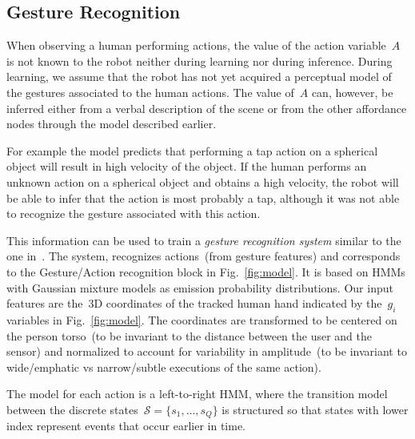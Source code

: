 \subsection{Gesture Recognition}
\label{sec:gesture_recognition}
When observing a human performing actions, the value of the action variable~$A$ is not known to the robot neither during learning nor during inference.
During learning, we assume that the robot has not yet acquired a perceptual model of the gestures associated to the human actions.
The value of~$A$ can, however, be inferred either from a verbal description of the scene or from the other affordance nodes through the \AffWords{} model described earlier.

For example %
the \AffWords{} model predicts that performing a tap action on a spherical object will result in high velocity of the object.
If the human performs an unknown action on a spherical object and obtains a high velocity, the robot will be able to infer that the action is most probably a tap, although it was not able to recognize the gesture associated with this action.

This information can be used to train a \emph{gesture recognition system} similar to the one in~\cite{saponaro:2013:crhri}.
The system, %
recognizes actions~(from gesture features) and corresponds to the Gesture/Action recognition block in Fig.~\ref{fig:model}.
It is based on \acp{HMM} with Gaussian mixture models as emission probability distributions. %
Our input features are the~3D coordinates of the tracked human hand indicated by the~$g_i$ variables in Fig.~\ref{fig:model}.
The coordinates are transformed to be centered on the person torso~(to be invariant to the distance between the user and the sensor) and normalized to account for variability in amplitude~(to be invariant to wide/emphatic vs narrow/subtle executions of the same action).

The model for each action is a
left-to-right \ac{HMM}, where the transition model between the discrete states~$\mathcal{S} = \{s_1, \dots, s_Q\}$ is structured so that states with lower index represent events that occur earlier in time.

